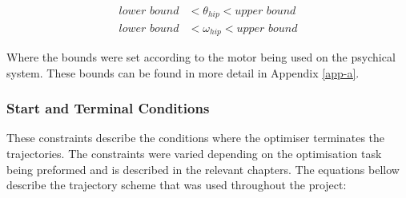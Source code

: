         \begin{equation}
            \begin{split}
                \textit{lower bound} &< \theta_{hip} < \textit{upper bound}\\
                \textit{lower bound} &< \omega_{hip} < \textit{upper bound}
            \end{split}
        \end{equation}
        
        Where the bounds were set according to the motor being used on the psychical system. These bounds can be found in more detail in Appendix \ref{app-a}.
        
        \subsubsection{Start and Terminal Conditions}
        These constraints describe the conditions where the optimiser terminates the trajectories. The constraints were varied depending on the optimisation task being preformed and is described in the relevant chapters. The equations bellow describe the trajectory scheme that was used throughout the project:
